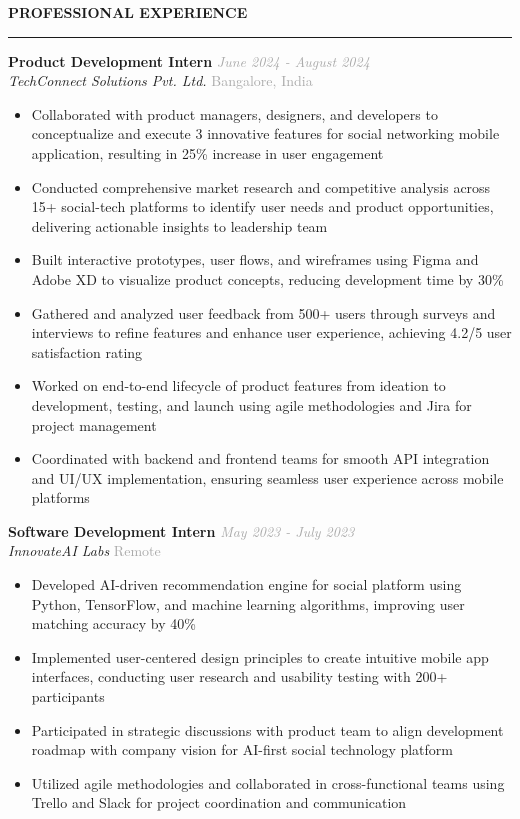 \documentclass[11pt,a4paper]{article}
\newcommand{\resumesection}[1]{
    \vspace{8pt}
    \textcolor{primarycolor}{\textbf{\Large #1}}
    \vspace{2pt}
    \hrule
    \vspace{6pt}
}
\newcommand{\resumesubsection}[4]{
    \textbf{#1} \hfill \textcolor{darkgray}{\textit{#2}} \\
    \textit{#3} \hfill \textcolor{darkgray}{#4} \\
    \vspace{2pt}
}
\begin{document}
\resumesection{PROFESSIONAL EXPERIENCE}

\resumesubsection{Product Development Intern}{June 2024 - August 2024}{TechConnect Solutions Pvt. Ltd.}{Bangalore, India}
\begin{itemize}[leftmargin=15pt, itemsep=2pt]
    \item Collaborated with product managers, designers, and developers to conceptualize and execute 3 innovative features for social networking mobile application, resulting in 25\% increase in user engagement
    \item Conducted comprehensive market research and competitive analysis across 15+ social-tech platforms to identify user needs and product opportunities, delivering actionable insights to leadership team
    \item Built interactive prototypes, user flows, and wireframes using Figma and Adobe XD to visualize product concepts, reducing development time by 30\%
    \item Gathered and analyzed user feedback from 500+ users through surveys and interviews to refine features and enhance user experience, achieving 4.2/5 user satisfaction rating
    \item Worked on end-to-end lifecycle of product features from ideation to development, testing, and launch using agile methodologies and Jira for project management
    \item Coordinated with backend and frontend teams for smooth API integration and UI/UX implementation, ensuring seamless user experience across mobile platforms
\end{itemize}

\resumesubsection{Software Development Intern}{May 2023 - July 2023}{InnovateAI Labs}{Remote}
\begin{itemize}[leftmargin=15pt, itemsep=2pt]
    \item Developed AI-driven recommendation engine for social platform using Python, TensorFlow, and machine learning algorithms, improving user matching accuracy by 40\%
    \item Implemented user-centered design principles to create intuitive mobile app interfaces, conducting user research and usability testing with 200+ participants
    \item Participated in strategic discussions with product team to align development roadmap with company vision for AI-first social technology platform
    \item Utilized agile methodologies and collaborated in cross-functional teams using Trello and Slack for project coordination and communication
\end{itemize}
\end{document}

